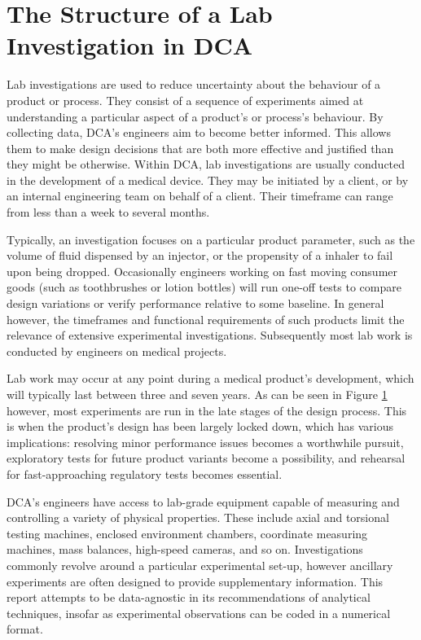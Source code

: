 \documentclass[11pt,a4paper,article]{memoir} %
\newlength\drop
\begin{document}
\section{The Structure of a Lab Investigation in DCA}
Lab investigations are used to reduce uncertainty about the behaviour of a product or process. They consist of a sequence of experiments aimed at understanding a particular aspect of a product's or process's behaviour. By collecting data, DCA's engineers aim to become better informed. This allows them to make design decisions that are both more effective and justified than they might be otherwise. Within DCA, lab investigations are usually conducted in the development of a medical device. They may be initiated by a client, or by an internal engineering team on behalf of a client. Their timeframe can range from less than a week to several months. 
 \par
 Typically, an investigation focuses on a particular product parameter, such as the volume of fluid dispensed by an injector, or the propensity of a inhaler to fail upon being dropped. Occasionally engineers working on fast moving consumer goods (such as toothbrushes or lotion bottles) will run one-off tests to compare design variations or verify performance relative to some baseline. In general however, the timeframes and functional requirements of such products limit the relevance of extensive experimental investigations. Subsequently most lab work is conducted by engineers on medical projects.
\par
Lab work may occur at any point during a medical product's development, which will typically last between three and seven years. As can be seen in Figure \ref{fig:time_of_tests} however, most experiments are run in the late stages of the design process. This is when the product's design has been largely locked down, which has various implications: resolving minor performance issues becomes a worthwhile pursuit, exploratory tests for future product variants become a possibility, and rehearsal for fast-approaching regulatory tests becomes essential.
\begin{figure}
\label{fig:time_of_tests}
\end{figure}
\par
DCA's engineers have access to lab-grade equipment capable of measuring and controlling a variety of physical properties. These include axial and torsional testing machines, enclosed environment chambers, coordinate measuring machines, mass balances, high-speed cameras, and so on. Investigations commonly revolve around a particular experimental set-up, however ancillary experiments are often designed to provide supplementary information. This report attempts to be data-agnostic in its recommendations of analytical techniques, insofar as experimental observations can be coded in a numerical format.
\end{document}
